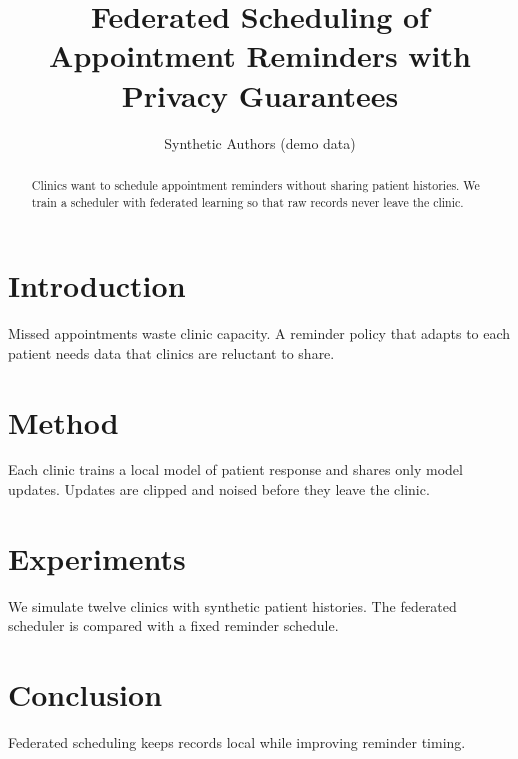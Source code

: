 \documentclass{article}
\title{Federated Scheduling of Appointment Reminders with Privacy Guarantees}
\author{Synthetic Authors (demo data)}
\begin{document}
\maketitle

\begin{abstract}
Clinics want to schedule appointment reminders without sharing patient histories. We train a scheduler with federated learning so that raw records never leave the clinic.
\end{abstract}

\section{Introduction}
Missed appointments waste clinic capacity. A reminder policy that adapts to each patient needs data that clinics are reluctant to share.

\section{Method}
Each clinic trains a local model of patient response and shares only model updates. Updates are clipped and noised before they leave the clinic.

\section{Experiments}
We simulate twelve clinics with synthetic patient histories. The federated scheduler is compared with a fixed reminder schedule.

\section{Conclusion}
Federated scheduling keeps records local while improving reminder timing.
\end{document}
